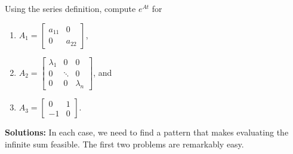 \bigskip
\begin{example} 
\label{ex:matrixExponentialFunctionHandComputation}
Using the series definition, compute $e^{At}$ for 
 \begin{enumerate}
\renewcommand{\labelenumi}{(\alph{enumi})}
\setlength{\itemsep}{.2cm}
     \item $A_1 = \left[ \begin{array}{cc} a_{11} & 0\\0 & a_{22}\end{array}\right]$,
     \item $A_2=\begin{bmatrix}\lambda_{1} & 0 & 0\\
0 & \ddots & 0\\
0 & 0 & \lambda_{n}
\end{bmatrix} $, and
     \item $A_3 = \left[ \begin{array}{rr} 0 & 1\\-1 & 0\end{array}\right]$.
\end{enumerate}    
\end{example}
\textbf{Solutions:} In each case, we need to find a pattern that makes evaluating the infinite sum feasible. The first two problems are remarkably easy.

